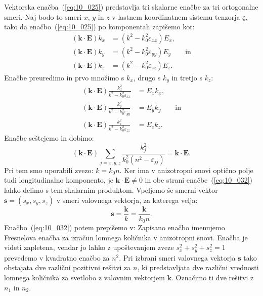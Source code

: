 Vektorska enačba~(\ref{eq:10_025}) predstavlja tri skalarne enačbe za tri 
ortogonalne smeri. Naj bodo to smeri $x$, $y$ in $z$ v lastnem koordinatnem sistemu
tenzorja $\underline{\varepsilon}$, tako da enačbo~(\ref{eq:10_025}) po komponentah 
zapišemo kot:
\begin{align}
\left(\mathbf{k}\cdot \mathbf{E}\right) k_x &= 
\left( k^2 -k_0^2 \varepsilon_{xx}\right) E_x, \label{eq:10_026}\\
\left(\mathbf{k}\cdot \mathbf{E}\right) k_y &= 
\left( k^2 -k_0^2 \varepsilon_{yy}\right) E_y \qquad \mathrm{in}\label{eq:10_027}\\
\left(\mathbf{k}\cdot \mathbf{E}\right) k_z &= \left( k^2 -k_0^2 \varepsilon_{zz}\right) E_z.
\label{eq:10_028}
\end{align}
Enačbe preuredimo in prvo množimo s $k_x$, drugo s $k_y$ in tretjo s $k_z$:
\begin{align}
\left(\mathbf{k}\cdot \mathbf{E}\right) 
\frac{k_x^2}{k^2 - k_0^2 \varepsilon_{xx}} &= E_x k_x, \label{eq:10_029}\\
\left(\mathbf{k}\cdot \mathbf{E}\right) 
\frac{k_y^2}{k^2 - k_0^2 \varepsilon_{yy}} &= E_y k_y \qquad \mathrm{in} \label{eq:10_030}\\
\left(\mathbf{k}\cdot \mathbf{E}\right) 
\frac{k_z^2}{k^2 - k_0^2 \varepsilon_{zz}} &= E_z k_z. \label{eq:10_031}
\end{align}
Enačbe seštejemo in dobimo:
\begin{equation}
\left(\mathbf{k}\cdot \mathbf{E}\right)  
\sum_{j=x,y,z} \frac{k_j^2}{k_0^2(n^2 - \varepsilon_{jj})}
 = \mathbf{k}\cdot \mathbf{E}.
\label{eq:10_032}
\end{equation}
Pri tem smo uporabili zvezo: $k = k_0 n$. Ker ima v anizotropni snovi 
optično polje tudi longitudinalno komponento, je $\mathbf{k}\cdot 
\mathbf{E} \neq 0$ in obe strani enačbe~(\ref{eq:10_032}) lahko 
delimo s tem skalarnim produktom.
Vpeljemo še smerni vektor $\mathbf{s} = (s_x, s_y, s_z)$ v smeri valovnega vektorja, 
za katerega velja:
\begin{equation}
\mathbf{s} = \frac{\mathbf{k}}{k} = \frac{\mathbf{k}}{k_0n}.
\label{eq:10_033}
\end{equation}
Enačbo~(\ref{eq:10_032}) potem prepišemo v:
Zapisano enačbo imenujemo Fresnelova enačba za izračun lomnega
količnika v anizotropni snovi. Enačba je videti 
zapletena, vendar jo lahko z upoštevanjem zveze 
$s_x^2+s_y^2+s_z^2 = 1$ prevedemo v kvadratno enačbo za $n^2$.
Pri izbrani smeri valovnega vektorja $\mathbf{s}$ tako
obstajata dve različni pozitivni rešitvi za $n$, ki 
predstavljata dve različni vrednosti lomnega količnika za
svetlobo z valovnim vektorjem $\mathbf{k}$.
Označimo ti dve rešitvi z $n_1$ in $n_2$. 

